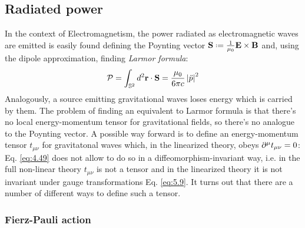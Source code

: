 \subsection{Radiated power}

In the context of Electromagnetism, the power radiated as electromagnetic waves are emitted is easily found defining the Poynting vector $ \ve{S} \defeq \frac{1}{\mu_0} \ve{E} \times \ve{B} $ and, using the dipole approximation, finding \textit{Larmor formula}:
\begin{equation*}
  \mathcal{P} = \int_{\mathbb{S}^2} d^2\mathbf{r} \cdot \mathbf{S} = \frac{\mu_0}{6\pi c} \left\lvert\ddot{p}\right\rvert^2
\end{equation*}
Analogously, a source emitting gravitational waves loses energy which is carried by them. The problem of finding an equivalent to Larmor formula is that there's no local energy-momentum tensor for gravitational fields, so there's no analogue to the Poynting vector. A possible way forward is to define an energy-momentum tensor $ t_{\mu \nu} $ for gravitatonal waves which, in the linearized theory, obeys $ \partial^\mu t_{\mu \nu} = 0 $: Eq. \ref{eq:4.49} does not allow to do so in a diffeomorphism-invariant way, i.e. in the full non-linear theory $ t_{\mu \nu} $ is not a tensor and in the linearized theory it is not invariant under gauge transformations Eq. \ref{eq:5.9}. It turns out that there are a number of different ways to define such a tensor.

\subsubsection{Fierz-Pauli action}

